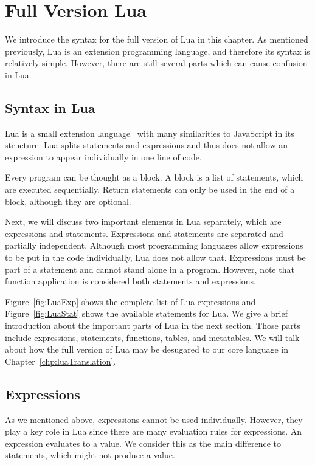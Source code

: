 \chapter{Full Version Lua}
We introduce the syntax for the full version of Lua in this chapter. As mentioned previously, Lua is an extension programming language, and therefore its syntax is relatively simple. However, there are still several parts which can cause confusion in Lua.

\section{Syntax in Lua}
Lua is a small extension language~\cite{PIL} with many similarities to JavaScript in its structure.  Lua splits statements and expressions and thus does not allow an expression to appear individually in one line of code.

Every program can be thought as a block. A block is a list of statements, which are executed sequentially. Return statements can only be used in the end of a block, although they are optional.

Next, we will discuss two important elements in Lua separately, which are expressions and statements.
Expressions and statements are separated and partially independent. Although most programming languages allow expressions to be put in the code individually, Lua does not allow that. Expressions must be part of a statement and cannot stand alone in a program. However, note that function application is considered both statements and expressions.

Figure~\ref{fig:LuaExp} shows the complete list of Lua expressions
and Figure~\ref{fig:LuaStat} shows the available statements for Lua.
We give a brief introduction about the important parts of Lua in the next section. Those parts include expressions, statements, functions, tables, and metatables. We will talk about how the full version of Lua may be desugared to our core language in Chapter~\ref{chp:luaTranslation}.


\newcommand{\syntax}[2]{{\tt #1}{\tt ~::=}{\tt ~~#2}\\}

\newcommand{\syntaxcase}[1]{{\tt \quad\quad\quad\quad\quad\quad~}{\tt ~~#1}\\}

\section{Expressions}
As we mentioned above, expressions cannot be used individually. However, they play a key role in Lua since there are many evaluation rules for expressions. An expression evaluates to a value. We consider this as the main difference to statements,
which might not produce a value.


